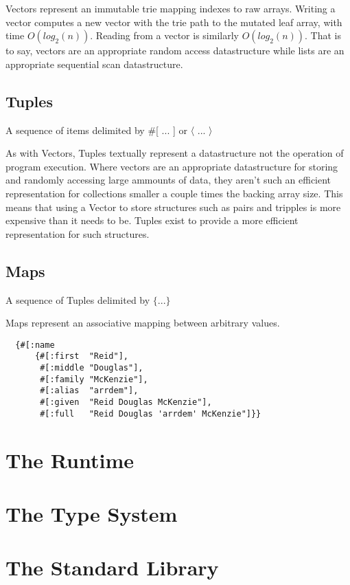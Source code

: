 \documentclass{report}
\begin{document}
Vectors represent an immutable trie mapping indexes to raw arrays. Writing a
vector computes a new vector with the trie path to the mutated leaf array,
with time $O(log_2(n))$. Reading from a vector is similarly
$O(log_2(n))$. That is to say, vectors are an appropriate random access
datastructure while lists are an appropriate sequential scan datastructure.

\section{Tuples}


A sequence of items delimited by \#[ ... ] or 〈 ... 〉

As with Vectors, Tuples textually represent a datastructure not the operation
of program execution. Where vectors are an appropriate datastructure for
storing and randomly accessing large ammounts of data, they aren't such an
efficient representation for collections smaller a couple times the backing
array size. This means that using a Vector to store structures such as pairs
and tripples is more expensive than it needs to be. Tuples exist to provide a
more efficient representation for such structures.

\section{Maps}


A sequence of Tuples delimited by $\{ ... \}$

Maps represent an associative mapping between arbitrary values.

\begin{lstlisting}
  {#[:name
      {#[:first  "Reid"],
       #[:middle "Douglas"],
       #[:family "McKenzie"],
       #[:alias  "arrdem"],
       #[:given  "Reid Douglas McKenzie"],
       #[:full   "Reid Douglas 'arrdem' McKenzie"]}}
\end{lstlisting}

\chapter{The Runtime}


\chapter{The Type System}


\chapter{The Standard Library}

\end{document}
